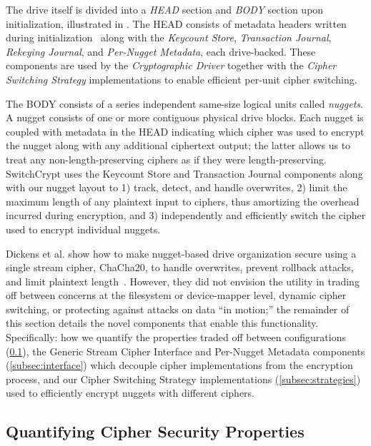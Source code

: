 The drive itself is divided into a \emph{HEAD} section and \emph{BODY} section
upon initialization, illustrated in . The HEAD consists of
metadata headers written during initialization~\cite{StrongBox} along with the
\emph{Keycount Store}, \emph{Transaction Journal}, \emph{Rekeying Journal}, and
\emph{Per-Nugget Metadata}, each drive-backed. These components are used by the
\emph{Cryptographic Driver} together with the \emph{Cipher Switching Strategy}
implementations to enable efficient per-unit cipher switching.

The BODY consists of a series independent same-size logical units called
\emph{nuggets}. A nugget consists of one or more contiguous physical drive
blocks. Each nugget is coupled with metadata in the HEAD indicating which cipher
was used to encrypt the nugget along with any additional ciphertext output; the
latter allows us to treat any non-length-preserving ciphers as if they were
length-preserving. SwitchCrypt uses the Keycount Store and Transaction Journal
components along with our nugget layout to 1) track, detect, and handle
overwrites, 2) limit the maximum length of any plaintext input to ciphers, thus
amortizing the overhead incurred during encryption, and 3) independently and
efficiently switch the cipher used to encrypt individual nuggets.

Dickens et al. show  how to make nugget-based drive organization secure using a
single stream cipher, ChaCha20, to handle overwrites, prevent rollback attacks,
and limit plaintext length~\cite{StrongBox}. However, they did not envision the
utility in trading off between concerns at the filesystem or device-mapper
level, dynamic cipher switching, or protecting against attacks on data ``in
motion;'' the remainder of this section details the novel components that enable
this functionality. Specifically: how we quantify the properties traded off
between configurations (\cref{subsec:quantify}), the Generic Stream Cipher
Interface and Per-Nugget Metadata components (\cref{subsec:interface}) which
decouple cipher implementations from the encryption process, and our Cipher
Switching Strategy implementations (\cref{subsec:strategies}) used to
efficiently encrypt nuggets with different ciphers.

\subsection{Quantifying Cipher Security Properties} \label{subsec:quantify}

